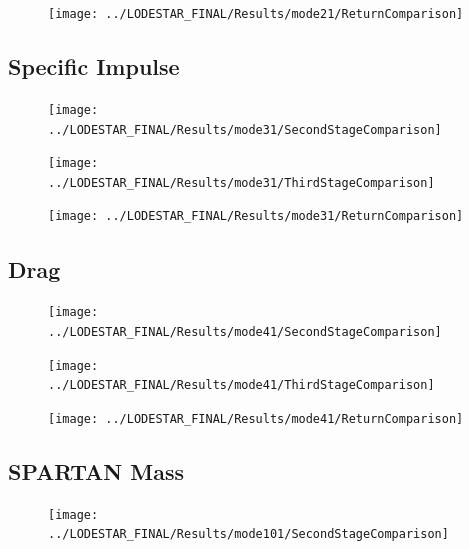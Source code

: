 \begin{figure}[th]
\centering
\texttt{[image: ../LODESTAR\_FINAL/Results/mode21/ReturnComparison]}
\caption{}
\label{fig:ReturnComparison}
\end{figure}


\subsection{Specific Impulse}
\begin{figure}[th]
\centering
\texttt{[image: ../LODESTAR\_FINAL/Results/mode31/SecondStageComparison]}
\caption{}
\label{fig:SecondStageComparison10}
\end{figure}

\begin{figure}[th]
\centering
\texttt{[image: ../LODESTAR\_FINAL/Results/mode31/ThirdStageComparison]}
\caption{}
\label{fig:ThirdStageComparison10}
\end{figure}

\begin{figure}[th]
\centering
\texttt{[image: ../LODESTAR\_FINAL/Results/mode31/ReturnComparison]}
\caption{}
\label{fig:ReturnComparison10}
\end{figure}


\subsection{Drag}
\begin{figure}[th]
\centering
\texttt{[image: ../LODESTAR\_FINAL/Results/mode41/SecondStageComparison]}
\caption{}
\label{fig:SecondStageComparison11}
\end{figure}

\begin{figure}[th]
\centering
\texttt{[image: ../LODESTAR\_FINAL/Results/mode41/ThirdStageComparison]}
\caption{}
\label{fig:ThirdStageComparison11}
\end{figure}

\begin{figure}[th]
\centering
\texttt{[image: ../LODESTAR\_FINAL/Results/mode41/ReturnComparison]}
\caption{}
\label{fig:ReturnComparison11}
\end{figure}


\subsection{SPARTAN Mass}

\begin{figure}[th]
\centering
\texttt{[image: ../LODESTAR\_FINAL/Results/mode101/SecondStageComparison]}
\caption{}
\label{fig:SecondStageComparison12}
\end{figure}

